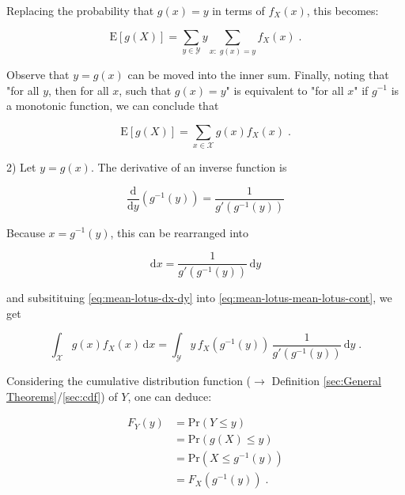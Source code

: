 \documentclass[a4paper,12pt,twoside]{book}
\begin{document}
Replacing the probability that $g(x) = y$ in terms of $f_X(x)$, this becomes:

\begin{equation} \label{eq:mean-lotus-mean-lotus-disc-s3}
\mathrm{E}[g(X)] = \sum_{y \in \mathcal{Y}} y \sum_{x: \; g(x) = y} f_X(x) \; .
\end{equation}

Observe that $y = g(x)$ can be moved into the inner sum. Finally, noting that "for all $y$, then for all $x$, such that $g(x) = y$" is equivalent to "for all $x$" if $g^{-1}$ is a monotonic function, we can conclude that

\begin{equation} \label{eq:mean-lotus-mean-lotus-disc-s4}
\mathrm{E}[g(X)] = \sum_{x \in \mathcal{X}} g(x) f_X(x) \; .
\end{equation}

\vspace{1em}
2) Let $y = g(x)$. The derivative of an inverse function is

\begin{equation} \label{eq:mean-lotus-der-inv}
\frac{\mathrm{d}}{\mathrm{d}y} (g^{-1}(y)) = \frac{1}{g'(g^{-1}(y))}
\end{equation}

Because $x = g^{-1}(y)$, this can be rearranged into

\begin{equation} \label{eq:mean-lotus-dx-dy}
\mathrm{d}x = \frac{1}{g'(g^{-1}(y))} \, \mathrm{d}y
\end{equation}

and subsitituing \eqref{eq:mean-lotus-dx-dy} into \eqref{eq:mean-lotus-mean-lotus-cont}, we get

\begin{equation} \label{eq:mean-lotus-mean-lotus-cont-s1}
\int_{\mathcal{X}} g(x) f_X(x) \, \mathrm{d}x = \int_{\mathcal{Y}} y \, f_X(g^{-1}(y)) \, \frac{1}{g'(g^{-1}(y))} \, \mathrm{d}y \; .
\end{equation}

Considering the cumulative distribution function ($\rightarrow$ Definition \ref{sec:General Theorems}/\ref{sec:cdf}) of $Y$, one can deduce:

\begin{equation} \label{eq:mean-lotus-Y-cdf}
\begin{split}
F_Y(y) &= \mathrm{Pr}(Y \leq y) \\
&= \mathrm{Pr}(g(X) \leq y) \\
&= \mathrm{Pr}(X \leq g^{-1}(y)) \\
&= F_X(g^{-1}(y)) \; .
\end{split}
\end{equation}
\end{document}
